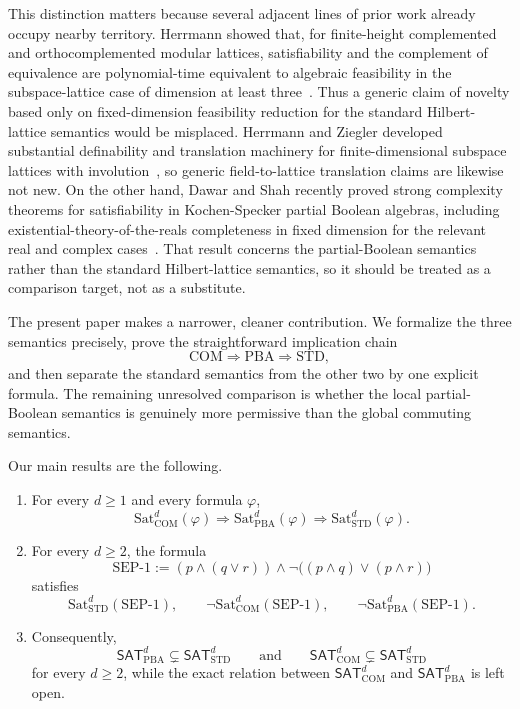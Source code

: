 \documentclass[11pt]{article}
\theoremstyle{plain}
\theoremstyle{definition}
\newcommand{\STD}{\mathrm{STD}}
\newcommand{\COM}{\mathrm{COM}}
\newcommand{\PBA}{\mathrm{PBA}}
\newcommand{\Sat}{\mathrm{Sat}}
\newcommand{\SEPone}{\mathrm{SEP}\text{-}1}
\begin{document}
This distinction matters because several adjacent lines of prior work already occupy nearby territory.
Herrmann showed that, for finite-height complemented and orthocomplemented modular lattices, satisfiability and the complement of equivalence are polynomial-time equivalent to algebraic feasibility in the subspace-lattice case of dimension at least three~\cite{Herrmann2022}.
Thus a generic claim of novelty based only on fixed-dimension feasibility reduction for the standard Hilbert-lattice semantics would be misplaced.
Herrmann and Ziegler developed substantial definability and translation machinery for finite-dimensional subspace lattices with involution~\cite{HerrmannZiegler2018,HerrmannZiegler2019}, so generic field-to-lattice translation claims are likewise not new.
On the other hand, Dawar and Shah recently proved strong complexity theorems for satisfiability in Kochen-Specker partial Boolean algebras, including existential-theory-of-the-reals completeness in fixed dimension for the relevant real and complex cases~\cite{DawarShah2026}.
That result concerns the partial-Boolean semantics rather than the standard Hilbert-lattice semantics, so it should be treated as a comparison target, not as a substitute.

The present paper makes a narrower, cleaner contribution.
We formalize the three semantics precisely, prove the straightforward implication chain
\[
\COM \Rightarrow \PBA \Rightarrow \STD,
\]
and then separate the standard semantics from the other two by one explicit formula.
The remaining unresolved comparison is whether the local partial-Boolean semantics is genuinely more permissive than the global commuting semantics.

Our main results are the following.

\begin{enumerate}[label=(\arabic*),leftmargin=2.1em]
  \item For every $d\geq 1$ and every formula $\varphi$,
  \[
  \Sat_{\COM}^d(\varphi) \Longrightarrow \Sat_{\PBA}^d(\varphi) \Longrightarrow \Sat_{\STD}^d(\varphi).
  \]
  \item For every $d\geq 2$, the formula
  \[
  \SEPone := (p\wedge(q\vee r))\wedge \neg\bigl((p\wedge q)\vee(p\wedge r)\bigr)
  \]
  satisfies
  \[
  \Sat_{\STD}^d(\SEPone),
  \qquad
  \neg\Sat_{\COM}^d(\SEPone),
  \qquad
  \neg\Sat_{\PBA}^d(\SEPone).
  \]
  \item Consequently,
  \[
  \mathsf{SAT}_{\PBA}^d \subsetneq \mathsf{SAT}_{\STD}^d
  \qquad\text{and}\qquad
  \mathsf{SAT}_{\COM}^d \subsetneq \mathsf{SAT}_{\STD}^d
  \]
  for every $d\geq 2$, while the exact relation between $\mathsf{SAT}_{\COM}^d$ and $\mathsf{SAT}_{\PBA}^d$ is left open.
\end{enumerate}
\end{document}

